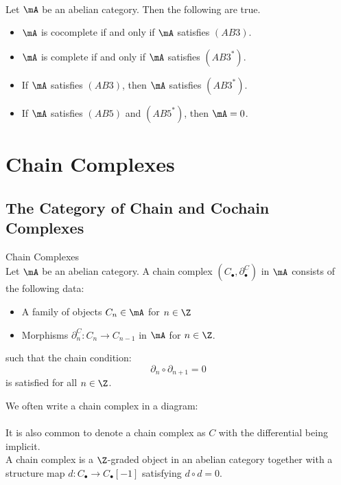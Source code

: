 \documentclass[a4paper]{article}
\begin{document}
\begin{prp}{}{}\\
Let $\mA$ be an abelian category. Then the following are true. 
\begin{itemize}
\item $\mA$ is cocomplete if and only if $\mA$ satisfies $(AB3)$. 
\item $\mA$ is complete if and only if $\mA$ satisfies $(AB3^\ast)$. 
\item If $\mA$ satisfies $(AB3)$, then $\mA$ satisfies $(AB3^\ast)$. 
\item If $\mA$ satisfies $(AB5)$ and $(AB5^\ast)$, then $\mA=0$. 
\end{itemize}
\end{prp}

\pagebreak
\section{Chain Complexes}
\subsection{The Category of Chain and Cochain Complexes}
\begin{defn}{Chain Complexes}{}\\
Let $\mA$ be an abelian category. A chain complex $(C_\bullet,\partial_\bullet^C)$ in $\mA$ consists of the following data: 
\begin{itemize}
\item A family of objects $C_n\in\mA$ for $n\in\Z$
\item Morphisms $\partial_n^C:C_n\to C_{n-1}$ in $\mA$ for $n\in\Z$. 
\end{itemize}
such that the chain condition: $$\partial_n\circ\partial_{n+1}=0$$ is satisfied for all $n\in\Z$. 
\end{defn}

We often write a chain complex in a diagram: \\
\\
It is also common to denote a chain complex as $C$ with the differential being implicit. \\

A chain complex is a $\Z$-graded object in an abelian category together with a structure map $d:C_\bullet\to C_\bullet[-1]$ satisfying $d\circ d=0$. 
\end{document}

